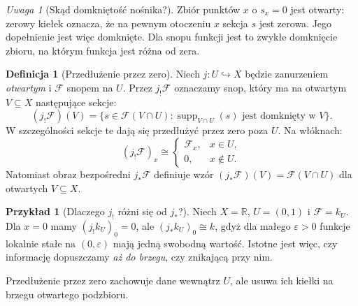\documentclass[11pt,a4paper,oneside]{report}
\newcommand{\R}{\mathbb{R}}
\theoremstyle{plain}
\theoremstyle{definition}
\newtheorem{definicja}[twierdzenie]{Definicja}
\newtheorem{przyklad}[twierdzenie]{Przykład}
\theoremstyle{remark}
\newtheorem{uwaga}[twierdzenie]{Uwaga}
\begin{document}
\begin{uwaga}[Skąd domkniętość nośnika?]
Zbiór punktów $x$ o $s_x=0$ jest otwarty: zerowy kiełek oznacza,
że na pewnym otoczeniu $x$ sekcja $s$ jest zerowa. Jego dopełnienie
jest więc domknięte. Dla snopu funkcji jest to zwykłe domknięcie
zbioru, na którym funkcja jest różna od zera.
\end{uwaga}

\begin{definicja}[Przedłużenie przez zero]
\label{def:jbang-v12}
Niech $j:U\hookrightarrow X$ będzie zanurzeniem \emph{otwartym}
i $\mathcal F$ snopem na $U$. Przez $j_!\mathcal F$ oznaczamy snop,
który ma na otwartym $V\subseteq X$ następujące sekcje:
\[(j_!\mathcal F)(V)=\{s\in\mathcal F(V\cap U):
\operatorname{supp}_{V\cap U}(s)\text{ jest domknięty w }V\}.\]
W szczególności sekcje te dają się przedłużyć przez zero
poza $U$. Na włóknach:
\[
(j_!\mathcal F)_x\cong
\begin{cases}\mathcal F_x,&x\in U,\\0,&x\notin U.\end{cases}
\]
Natomiast obraz bezpośredni $j_*\mathcal F$ definiuje wzór
$(j_*\mathcal F)(V)=\mathcal F(V\cap U)$ dla otwartych $V\subseteq X$.
\end{definicja}

\begin{przyklad}[Dlaczego $j_!$ różni się od $j_*$?]
Niech $X=\R$, $U=(0,1)$ i $\mathcal F=k_U$. Dla $x=0$ mamy
$(j_!k_U)_0=0$, ale $(j_*k_U)_0\cong k$, gdyż dla małego
$\varepsilon>0$ funkcje lokalnie stałe na $(0,\varepsilon)$
mają jedną swobodną wartość. Istotne jest więc, czy
informację dopuszczamy \emph{aż do brzegu}, czy znikającą przy nim.
\end{przyklad}

\begin{center}
\par\smallskip\small Przedłużenie przez zero zachowuje dane wewnątrz $U$,
ale usuwa ich kiełki na brzegu otwartego podzbioru.
\end{center}
\end{document}
